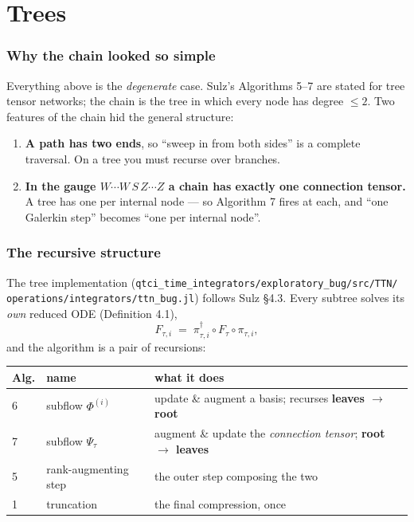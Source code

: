 \documentclass[11pt,a4paper]{article}
\newcommand{\code}[1]{\texttt{\small #1}}
\begin{document}
\part{Trees}
\label{part:tree}

\section{Why the chain looked so simple}

Everything above is the \emph{degenerate} case. Sulz's Algorithms 5--7 are stated for tree
tensor networks; the chain is the tree in which every node has degree $\le2$. Two features of
the chain hid the general structure:

\begin{enumerate}[nosep,leftmargin=1.6em]
  \item \textbf{A path has two ends}, so ``sweep in from both sides'' is a complete traversal.
        On a tree you must recurse over branches.
  \item \textbf{In the gauge $W\cdots W\,S\,Z\cdots Z$ a chain has exactly one connection
        tensor.} A tree has one per internal node --- so Algorithm 7 fires at each, and ``one
        Galerkin step'' becomes ``one per internal node''.
\end{enumerate}

\section{The recursive structure}

The tree implementation (\code{qtci\_time\_integrators/exploratory\_bug/src/TTN/}
\code{operations/integrators/ttn\_bug.jl}) follows Sulz \S4.3. Every subtree solves its
\emph{own} reduced ODE (Definition 4.1),
\[
  F_{\tau,i} \;=\; \pi^\dagger_{\tau,i}\circ F_\tau\circ\pi_{\tau,i},
\]
and the algorithm is a pair of recursions:

\begin{center}
\begin{tabular}{@{}llp{7.4cm}@{}}
\toprule
\textbf{Alg.} & \textbf{name} & \textbf{what it does} \\
\midrule
6 & subflow $\Phi^{(i)}$ & update \& augment a basis; recurses \textbf{leaves $\to$ root} \\
7 & subflow $\Psi_\tau$ & augment \& update the \emph{connection tensor}; \textbf{root $\to$ leaves} \\
5 & rank-augmenting step & the outer step composing the two \\
1 & truncation & the final compression, once \\
\bottomrule
\end{tabular}
\end{center}
\end{document}

